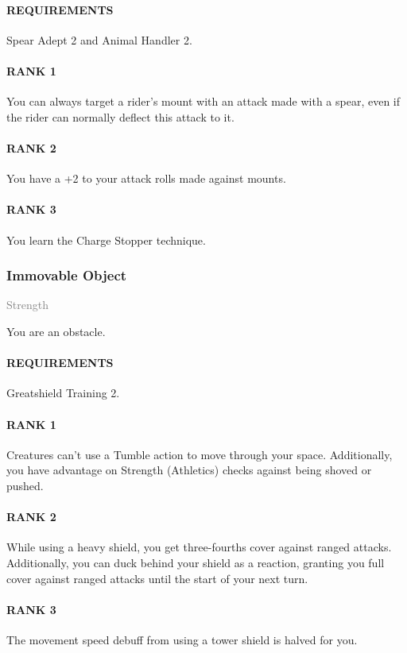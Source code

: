 \paragraph{REQUIREMENTS} Spear Adept 2 and Animal Handler 2.
\paragraph{RANK 1} You can always target a rider's mount with an attack made with a spear, even if the rider can normally deflect this attack to it.
\paragraph{RANK 2} You have a +2 to your attack rolls made against mounts.
\paragraph{RANK 3} You learn the Charge Stopper technique.

\subsubsection{Immovable Object} \label{feat::immovableobject}
\small{\textcolor{gray}{Strength}}

\normalsize
You are an obstacle.
\paragraph{REQUIREMENTS} Greatshield Training 2.
\paragraph{RANK 1} Creatures can't use a Tumble action to move through your space.
Additionally, you have advantage on Strength (Athletics) checks against being shoved or pushed.
\paragraph{RANK 2} While using a heavy shield, you get three-fourths cover against ranged attacks.
Additionally, you can duck behind your shield as a reaction, granting you full cover against ranged attacks until the start of your next turn.
\paragraph{RANK 3} The movement speed debuff from using a tower shield is halved for you.

